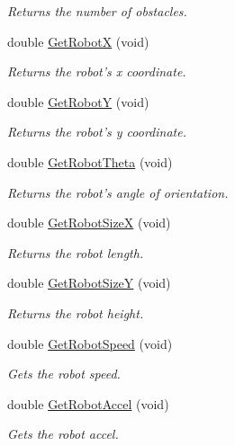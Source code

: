 \begin{DoxyCompactItemize}
\begin{DoxyCompactList}\small\item\em Returns the number of obstacles. \end{DoxyCompactList}\item 
double \hyperlink{classRobotSimulator_ac7bea18d767ec267142fbc72391ca89b}{Get\-Robot\-X} (void)
\begin{DoxyCompactList}\small\item\em Returns the robot's x coordinate. \end{DoxyCompactList}\item 
double \hyperlink{classRobotSimulator_a83e9060cfd1bab860ae56c80697d6de0}{Get\-Robot\-Y} (void)
\begin{DoxyCompactList}\small\item\em Returns the robot's y coordinate. \end{DoxyCompactList}\item 
double \hyperlink{classRobotSimulator_ade2906f35ab46657323d354ba5c7ba50}{Get\-Robot\-Theta} (void)
\begin{DoxyCompactList}\small\item\em Returns the robot's angle of orientation. \end{DoxyCompactList}\item 
double \hyperlink{classRobotSimulator_ace930a7f7cbef97b82c08629a3319b05}{Get\-Robot\-Size\-X} (void)
\begin{DoxyCompactList}\small\item\em Returns the robot length. \end{DoxyCompactList}\item 
double \hyperlink{classRobotSimulator_ae2efdc2fbc4793f205b2f4c10d4a301d}{Get\-Robot\-Size\-Y} (void)
\begin{DoxyCompactList}\small\item\em Returns the robot height. \end{DoxyCompactList}\item 
double \hyperlink{classRobotSimulator_a660a5fac6b81c87528aba1d3f978b75f}{Get\-Robot\-Speed} (void)
\begin{DoxyCompactList}\small\item\em Gets the robot speed. \end{DoxyCompactList}\item 
double \hyperlink{classRobotSimulator_a05fd185adb07605ab99da82a07028fb9}{Get\-Robot\-Accel} (void)
\begin{DoxyCompactList}\small\item\em Gets the robot accel. \end{DoxyCompactList}\item 

\end{DoxyCompactItemize}

